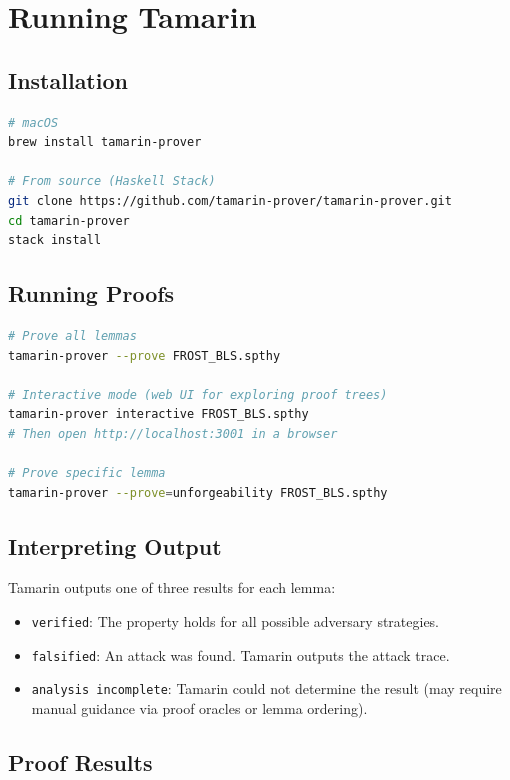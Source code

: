 \section{Running Tamarin}


\subsection{Installation}

\begin{lstlisting}[language=bash,caption={Installing Tamarin}]
# macOS
brew install tamarin-prover

# From source (Haskell Stack)
git clone https://github.com/tamarin-prover/tamarin-prover.git
cd tamarin-prover
stack install
\end{lstlisting}

\subsection{Running Proofs}

\begin{lstlisting}[language=bash,caption={Running Tamarin}]
# Prove all lemmas
tamarin-prover --prove FROST_BLS.spthy

# Interactive mode (web UI for exploring proof trees)
tamarin-prover interactive FROST_BLS.spthy
# Then open http://localhost:3001 in a browser

# Prove specific lemma
tamarin-prover --prove=unforgeability FROST_BLS.spthy
\end{lstlisting}

\subsection{Interpreting Output}

Tamarin outputs one of three results for each lemma:
\begin{itemize}[nosep]
  \item \texttt{verified}: The property holds for all possible adversary strategies.
  \item \texttt{falsified}: An attack was found. Tamarin outputs the attack trace.
  \item \texttt{analysis incomplete}: Tamarin could not determine the result (may require
    manual guidance via proof oracles or lemma ordering).
\end{itemize}

\subsection{Proof Results}

